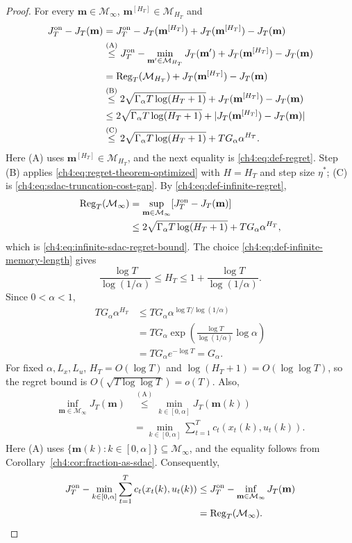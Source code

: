 \begin{proof}
For every $\mathbf m\in\mathcal M_\infty$,
$\mathbf m^{[H_T]}\in\mathcal M_{H_T}$ and
\begin{align*}
J_T^{\mathrm{on}}-J_T(\mathbf m)
&=J_T^{\mathrm{on}}-J_T(\mathbf m^{[H_T]})
+J_T(\mathbf m^{[H_T]})-J_T(\mathbf m)\\
&\overset{\mathrm{(A)}}{\le}
 J_T^{\mathrm{on}}-\min_{\mathbf m'\in\mathcal M_{H_T}}J_T(\mathbf m')
 +J_T(\mathbf m^{[H_T]})-J_T(\mathbf m)\\
&=\mathrm{Reg}_T(\mathcal M_{H_T})
 +J_T(\mathbf m^{[H_T]})-J_T(\mathbf m)\\
&\overset{\mathrm{(B)}}{\le}
 2\sqrt{\Gamma_\alpha T\log(H_T+1)}
+J_T(\mathbf m^{[H_T]})-J_T(\mathbf m)\\
&\le2\sqrt{\Gamma_\alpha T\log(H_T+1)}
 +|J_T(\mathbf m^{[H_T]})-J_T(\mathbf m)|\\
&\overset{\mathrm{(C)}}{\le}
 2\sqrt{\Gamma_\alpha T\log(H_T+1)}+TG_\alpha\alpha^{H_T}.
\end{align*}
Here (A) uses $\mathbf m^{[H_T]}\in\mathcal M_{H_T}$, and the next equality
is \eqref{ch4:eq:def-regret}. Step (B) applies
\eqref{ch4:eq:regret-theorem-optimized} with $H=H_T$ and step size $\eta^*$;
(C) is \eqref{ch4:eq:sdac-truncation-cost-gap}. By
\eqref{ch4:eq:def-infinite-regret},
\[
\begin{aligned}
\mathrm{Reg}_T(\mathcal M_\infty)
&=\sup_{\mathbf m\in\mathcal M_\infty}
  [J_T^{\mathrm{on}}-J_T(\mathbf m)]\\
&\le2\sqrt{\Gamma_\alpha T\log(H_T+1)}+TG_\alpha\alpha^{H_T},
\end{aligned}
\]
which is \eqref{ch4:eq:infinite-sdac-regret-bound}. The choice
\eqref{ch4:eq:def-infinite-memory-length} gives
\[
\frac{\log T}{\log(1/\alpha)}\le H_T
\le1+\frac{\log T}{\log(1/\alpha)}.
\]
Since $0<\alpha<1$,
\[
\begin{aligned}
TG_\alpha\alpha^{H_T}
&\le TG_\alpha\alpha^{\log T/\log(1/\alpha)}\\
&=TG_\alpha\exp\!\left(\frac{\log T}{\log(1/\alpha)}\log\alpha\right)\\
&=TG_\alpha e^{-\log T}=G_\alpha.
\end{aligned}
\]
For fixed $\alpha,L_x,L_u$,
$H_T=O(\log T)$ and $\log(H_T+1)=O(\log\log T)$, so the regret bound is
$O(\sqrt{T\log\log T})=o(T)$.
Also,
\begin{align*}
 \inf_{\mathbf m\in\mathcal M_\infty}J_T(\mathbf m)
 &\overset{\mathrm{(A)}}{\le}\min_{k\in[0,\alpha]}J_T(\mathbf m(k))\\
 &=\min_{k\in[0,\alpha]}
   \sum_{t=1}^Tc_t(x_t(k),u_t(k)).
\end{align*}
Here (A) uses $\{\mathbf m(k):k\in[0,\alpha]\}\subseteq\mathcal M_\infty$,
and the equality follows from Corollary~\ref{ch4:cor:fraction-as-sdac}.
Consequently,
\[
\begin{aligned}
J_T^{\mathrm{on}}-\min_{k\in[0,\alpha]}
 \sum_{t=1}^Tc_t(x_t(k),u_t(k))
&\le J_T^{\mathrm{on}}-\inf_{\mathbf m\in\mathcal M_\infty}J_T(\mathbf m)\\
&=\mathrm{Reg}_T(\mathcal M_\infty).
\end{aligned}
\]
\end{proof}

